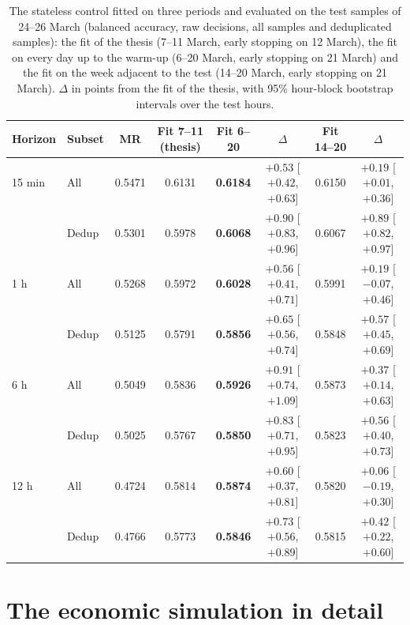 \begin{table}[t]
\centering
\caption{The stateless control fitted on three periods and evaluated on the test samples of
24--26 March (balanced accuracy, raw decisions, all samples and deduplicated samples): the
fit of the thesis (7--11 March, early stopping on 12 March), the fit on every day up to the
warm-up (6--20 March, early stopping on 21 March) and the fit on the week adjacent to the
test (14--20 March, early stopping on 21 March).  $\Delta$ in points from the fit of the
thesis, with 95\% hour-block bootstrap intervals over the test hours.}
\label{tab:app:lag}
\small
\begin{fittable}\begin{tabular}{llcccccc}
\toprule
Horizon & Subset & MR & Fit 7--11 (thesis) & Fit 6--20 & $\Delta$ & Fit 14--20 & $\Delta$ \\
\midrule
15 min & All   & 0.5471 & 0.6131 & \textbf{0.6184} & $+0.53$ [$+0.42$, $+0.63$] & 0.6150 & $+0.19$ [$+0.01$, $+0.36$] \\
       & Dedup & 0.5301 & 0.5978 & \textbf{0.6068} & $+0.90$ [$+0.83$, $+0.96$] & 0.6067 & $+0.89$ [$+0.82$, $+0.97$] \\
1 h    & All   & 0.5268 & 0.5972 & \textbf{0.6028} & $+0.56$ [$+0.41$, $+0.71$] & 0.5991 & $+0.19$ [$-0.07$, $+0.46$] \\
       & Dedup & 0.5125 & 0.5791 & \textbf{0.5856} & $+0.65$ [$+0.56$, $+0.74$] & 0.5848 & $+0.57$ [$+0.45$, $+0.69$] \\
6 h    & All   & 0.5049 & 0.5836 & \textbf{0.5926} & $+0.91$ [$+0.74$, $+1.09$] & 0.5873 & $+0.37$ [$+0.14$, $+0.63$] \\
       & Dedup & 0.5025 & 0.5767 & \textbf{0.5850} & $+0.83$ [$+0.71$, $+0.95$] & 0.5823 & $+0.56$ [$+0.40$, $+0.73$] \\
12 h   & All   & 0.4724 & 0.5814 & \textbf{0.5874} & $+0.60$ [$+0.37$, $+0.81$] & 0.5820 & $+0.06$ [$-0.19$, $+0.30$] \\
       & Dedup & 0.4766 & 0.5773 & \textbf{0.5846} & $+0.73$ [$+0.56$, $+0.89$] & 0.5815 & $+0.42$ [$+0.22$, $+0.60$] \\
\bottomrule
\end{tabular}\end{fittable}
\end{table}

\section{The economic simulation in detail}
\label{app:results:econ}

